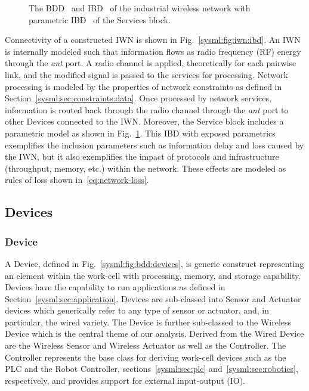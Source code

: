 \begin{figure}[ht]
	\caption{The BDD~\protect{} and IBD~\protect{} of the industrial wireless network with parametric IBD~\protect{} of the Services block.}
	\label{sysml:fig:iwn:ibd:full}
\end{figure}

Connectivity of a constructed IWN is shown in Fig.~\ref{sysml:fig:iwn:ibd}.  An IWN is internally modeled such that information flows as radio frequency (RF) energy through the \textit{ant} port.  A radio channel is applied, theoretically for each pairwise link, and the modified signal is passed to the services for processing.  Network processing is modeled by the properties of network constraints as defined in Section~\ref{sysml:sec:constraints:data}.  Once processed by network services, information is routed back through the radio channel through the \textit{ant} port to other Devices connected to the IWN.  Moreover, the Service block includes a parametric model as shown in Fig.~\ref{sysml:fig:iwn:ibd:full}. This IBD with exposed parametrics exemplifies the inclusion parameters such as information delay and loss caused by the IWN, but it also exemplifies the impact of protocols and infrastructure (throughput, memory, etc.) within the network.  These effects are modeled as rules of loss shown in~\eqref{eq:network-loss}.

\subsection{Devices}\label{sysml:sec:devices}

\subsubsection{Device}\label{sysml:sec:devices:device}

A Device, defined in Fig.~\ref{sysml:fig:bdd:devices}, is generic construct representing an element within the work-cell with processing, memory, and storage capability. Devices have the capability to run applications as defined in Section~\ref{sysml:sec:application}.  Devices are sub-classed into Sensor and Actuator devices which generically refer to any type of sensor or actuator, and, in particular, the wired variety.  The Device is further sub-classed to the Wireless Device which is the central theme of our analysis.  Derived from the Wired Device are the Wireless Sensor and Wireless Actuator as well as the Controller.  The Controller represents the base class for deriving work-cell devices such as the PLC and the Robot Controller, sections~\ref{sysml:sec:plc} and~\ref{sysml:sec:robotics}, respectively, and provides support for external input-output (IO).

